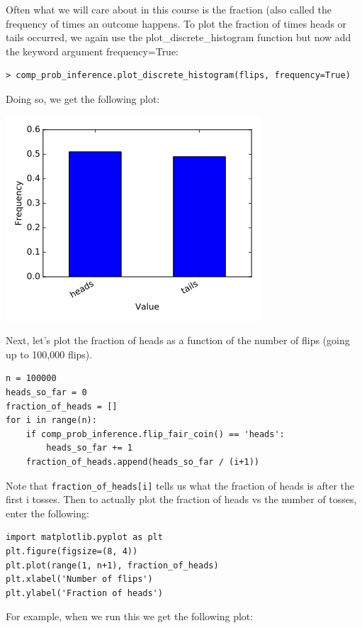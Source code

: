 \documentclass[6008notes.tex]{subfiles}
\begin{document}
Often what we will care about in this course is the fraction (also called the frequency of times an outcome happens. To plot the fraction of times heads or tails occurred, we again use the plot\_discrete\_histogram function but now add the keyword argument frequency=True:

\begin{lstlisting}
> comp_prob_inference.plot_discrete_histogram(flips, frequency=True)
\end{lstlisting}

Doing so, we get the following plot:

{\centering\includegraphics[scale=0.5]{images_sec-intro-histogram-frequencies} \par}


Next, let's plot the fraction of heads as a function of the number of flips (going up to 100,000 flips).

\begin{lstlisting}
n = 100000
heads_so_far = 0
fraction_of_heads = []
for i in range(n):
    if comp_prob_inference.flip_fair_coin() == 'heads':
        heads_so_far += 1
    fraction_of_heads.append(heads_so_far / (i+1))
\end{lstlisting}
Note that \texttt{fraction\_of\_heads[i]} tells us what the fraction of heads is after the first i tosses. Then to actually plot the fraction of heads vs the number of tosses, enter the following:

\begin{lstlisting}
import matplotlib.pyplot as plt
plt.figure(figsize=(8, 4))
plt.plot(range(1, n+1), fraction_of_heads)
plt.xlabel('Number of flips')
plt.ylabel('Fraction of heads')
\end{lstlisting}

For example, when we run this we get the following plot:
\end{document}
